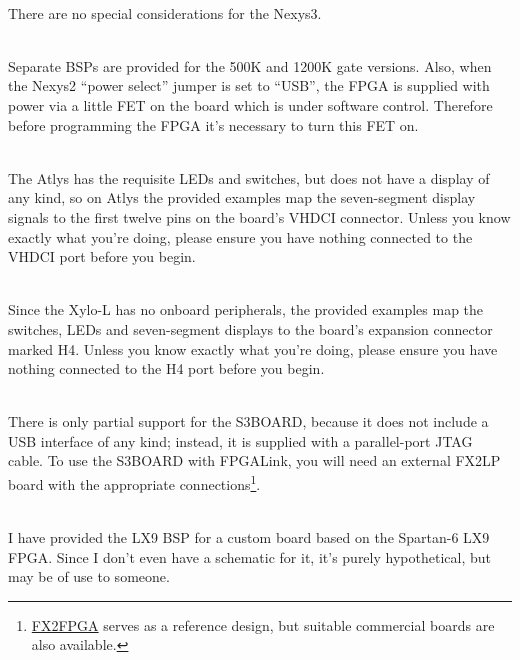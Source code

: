 \begin{desc}
  \item[\sffamily{\href{http://www.digilentinc.com/Products/Detail.cfm?Prod=Nexys3}{Digilent Nexys3}:}] \hfill \\
    There are no special considerations for the Nexys3.
  \item[\sffamily{\href{http://www.digilentinc.com/Products/Detail.cfm?Prod=NEXYS2}{Digilent Nexys2 (500K \& 1200K versions)}:}] \hfill \\
    Separate BSPs are provided for the 500K and 1200K gate versions. Also, when the Nexys2 ``power select'' jumper is set to ``USB'', the FPGA is supplied with power via a little FET on the board which is under software control. Therefore before programming the FPGA it's necessary to turn this FET on.
  \item[\sffamily{\href{http://www.digilentinc.com/Products/Detail.cfm?Prod=ATLYS}{Digilent Atlys}:}] \hfill \\
    The Atlys has the requisite LEDs and switches, but does not have a display of any kind, so on Atlys the provided examples map the seven-segment display signals to the first twelve pins on the board's VHDCI connector. Unless you know exactly what you're doing, please ensure you have nothing connected to the VHDCI port before you begin.
  \item[\sffamily{\href{http://www.knjn.com/shop.html?pg=pic&src=images/Board_Xylo-L_details.jpg\&title=The\%20Xylo-L\%20board}{KNJN Xylo-L}:}] \hfill \\
    Since the Xylo-L has no onboard peripherals, the provided examples map the switches, LEDs and seven-segment displays to the board's expansion connector marked H4. Unless you know exactly what you're doing, please ensure you have nothing connected to the H4 port before you begin.
  \item[\sffamily{\href{http://www.digilentinc.com/Products/Detail.cfm?Prod=S3BOARD}{Digilent S3BOARD}:}] \hfill \\
    There is only partial support for the S3BOARD, because it does not include a USB interface of any kind; instead, it is supplied with a parallel-port JTAG cable. To use the S3BOARD with FPGALink, you will need an external FX2LP board with the appropriate connections\footnote{\href{http://www.makestuff.eu/wordpress/?page_id=446}{FX2FPGA} serves as a reference design, but suitable commercial boards are also available.}.
  \item[\sffamily{Hypothetical LX9 Board:}] \hfill \\
    I have provided the LX9 BSP for a custom board based on the Spartan-6 LX9 FPGA. Since I don't even have a schematic for it, it's purely hypothetical, but may be of use to someone.
\end{desc}

